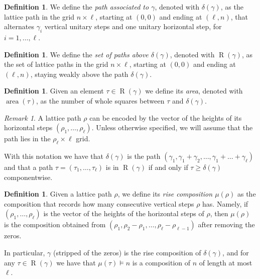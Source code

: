 \documentclass[reqno]{amsart}
\theoremstyle{plain}
\theoremstyle{definition}
\newtheorem{definition}[theorem]{Definition}
\theoremstyle{remark}
\newtheorem{remark}[theorem]{Remark}
\DeclareMathOperator{\R}{R}
\DeclareMathOperator{\area}{area}
\newcommand{\<}{\langle}
\renewcommand{\>}{\rangle}
\begin{document}
\begin{definition}
    We define the \emph{path associated to $\gamma$}, denoted with $\delta(\gamma)$, as the lattice path in the grid $n\times\ell$, starting at $(0,0)$ and ending at $(\ell,n)$, that alternates $\gamma_i$ vertical unitary steps and one unitary horizontal step, for $i=1,\dots,\ell$.
\end{definition}

\begin{definition}
    We define the \emph{set of paths above $\delta\left(\gamma\right)$}, denoted with $\R(\gamma)$, as the set of lattice paths in the grid $n\times\ell$, starting at $(0,0)$ and ending at $(\ell,n)$, staying weakly above the path $\delta(\gamma)$.
\end{definition}

\begin{definition}
    Given an element $\tau\in \R(\gamma)$ we define its \emph{area}, denoted with $\area(\tau)$, as the number of whole squares between $\tau$ and $\delta(\gamma)$.
\end{definition}

\begin{remark}
    \label{rmk:heights}
    A lattice path $\rho$ can be encoded by the vector of the heights of its horizontal steps $(\rho_1,\dots,\rho_\ell)$. Unless otherwise specified, we will assume that the path lies in the $\rho_\ell\times\ell$ grid.

    With this notation we have that $\delta(\gamma)$ is the path $(\gamma_1,\gamma_1+\gamma_2,\dots,\gamma_1+\dots+\gamma_\ell)$ and that a path $\tau=(\tau_1,\dots,\tau_\ell)$ is in $\R(\gamma)$ if and only if $\tau \geq \delta(\gamma)$ componentwise.
\end{remark}

\begin{definition}
    Given a lattice path $\rho$, %
    we define its \emph{rise composition $\mu(\rho)$} as the composition that records how many consecutive vertical steps $\rho$ has. Namely, if $(\rho_1,\dots,\rho_\ell)$ is the vector of the heights of the horizontal steps of $\rho$, then $\mu(\rho)$ is the composition obtained from $(\rho_1,\rho_2-\rho_1,\dots,\rho_\ell-\rho_{\ell-1})$ after removing the zeros.
\end{definition}

In particular, $\gamma$ (stripped of the zeros) is the rise composition of $\delta(\gamma)$, and for any $\tau \in \R(\gamma)$ we have that $\mu(\tau) \vDash n$ is a composition of $n$ of length at most $\ell$.
\end{document}
